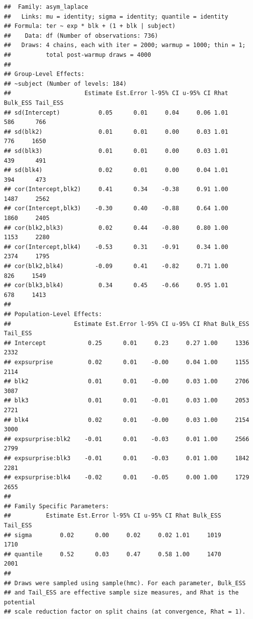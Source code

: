 \documentclass[
]{article}
\begin{document}
\begin{verbatim}
##  Family: asym_laplace 
##   Links: mu = identity; sigma = identity; quantile = identity 
## Formula: ter ~ exp * blk + (1 + blk | subject) 
##    Data: df (Number of observations: 736) 
##   Draws: 4 chains, each with iter = 2000; warmup = 1000; thin = 1;
##          total post-warmup draws = 4000
## 
## Group-Level Effects: 
## ~subject (Number of levels: 184) 
##                     Estimate Est.Error l-95% CI u-95% CI Rhat Bulk_ESS Tail_ESS
## sd(Intercept)           0.05      0.01     0.04     0.06 1.01      586      766
## sd(blk2)                0.01      0.01     0.00     0.03 1.01      776     1650
## sd(blk3)                0.01      0.01     0.00     0.03 1.01      439      491
## sd(blk4)                0.02      0.01     0.00     0.04 1.01      394      473
## cor(Intercept,blk2)     0.41      0.34    -0.38     0.91 1.00     1487     2562
## cor(Intercept,blk3)    -0.30      0.40    -0.88     0.64 1.00     1860     2405
## cor(blk2,blk3)          0.02      0.44    -0.80     0.80 1.00     1153     2280
## cor(Intercept,blk4)    -0.53      0.31    -0.91     0.34 1.00     2374     1795
## cor(blk2,blk4)         -0.09      0.41    -0.82     0.71 1.00      826     1549
## cor(blk3,blk4)          0.34      0.45    -0.66     0.95 1.01      678     1413
## 
## Population-Level Effects: 
##                  Estimate Est.Error l-95% CI u-95% CI Rhat Bulk_ESS Tail_ESS
## Intercept            0.25      0.01     0.23     0.27 1.00     1336     2332
## expsurprise          0.02      0.01    -0.00     0.04 1.00     1155     2114
## blk2                 0.01      0.01    -0.00     0.03 1.00     2706     3087
## blk3                 0.01      0.01    -0.01     0.03 1.00     2053     2721
## blk4                 0.02      0.01    -0.00     0.03 1.00     2154     3000
## expsurprise:blk2    -0.01      0.01    -0.03     0.01 1.00     2566     2799
## expsurprise:blk3    -0.01      0.01    -0.03     0.01 1.00     1842     2281
## expsurprise:blk4    -0.02      0.01    -0.05     0.00 1.00     1729     2655
## 
## Family Specific Parameters: 
##          Estimate Est.Error l-95% CI u-95% CI Rhat Bulk_ESS Tail_ESS
## sigma        0.02      0.00     0.02     0.02 1.01     1019     1710
## quantile     0.52      0.03     0.47     0.58 1.00     1470     2001
## 
## Draws were sampled using sample(hmc). For each parameter, Bulk_ESS
## and Tail_ESS are effective sample size measures, and Rhat is the potential
## scale reduction factor on split chains (at convergence, Rhat = 1).
\end{verbatim}
\end{document}
